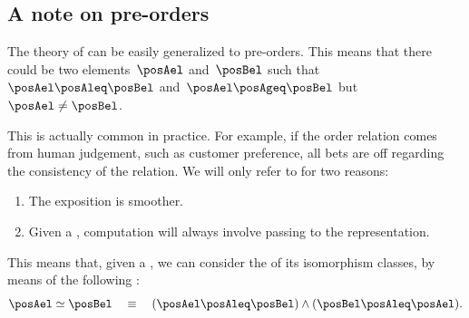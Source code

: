 \subsection{A note on pre-orders}


    The theory of  can be easily generalized to pre-orders.
    This means that there could be two elements~$\posAel$ and~$\posBel$ such that~$\posAel\posAleq \posBel$ and~$\posAel \posAgeq \posBel$ but~$\posAel \neq \posBel$.

    This is actually common in practice.
    For example, if the order relation comes from human judgement, such as customer preference, all bets are off regarding the consistency of the relation.
    We will only refer to  for two reasons:
    \begin{enumerate}
        \item The exposition is smoother.
        \item Given a , computation will always involve passing to the  representation.
    \end{enumerate}
    This means that, given a , we can consider the  of its isomorphism classes, by means of the following :
    \begin{equation}
        \posAel \simeq \posBel \quad \equiv \quad (\posAel \posAleq \posBel) \wedge (\posBel \posAleq \posAel).
    \end{equation}

